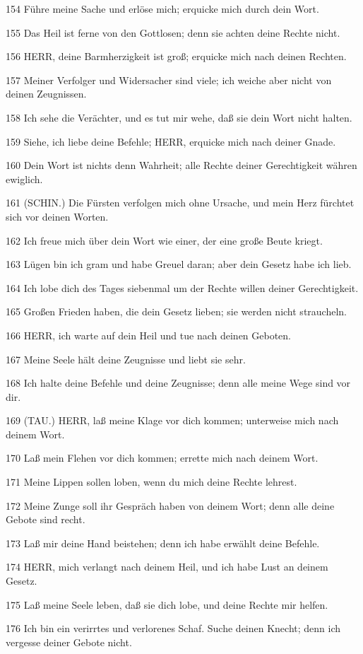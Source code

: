 \par 154 Führe meine Sache und erlöse mich; erquicke mich durch dein Wort.
\par 155 Das Heil ist ferne von den Gottlosen; denn sie achten deine Rechte nicht.
\par 156 HERR, deine Barmherzigkeit ist groß; erquicke mich nach deinen Rechten.
\par 157 Meiner Verfolger und Widersacher sind viele; ich weiche aber nicht von deinen Zeugnissen.
\par 158 Ich sehe die Verächter, und es tut mir wehe, daß sie dein Wort nicht halten.
\par 159 Siehe, ich liebe deine Befehle; HERR, erquicke mich nach deiner Gnade.
\par 160 Dein Wort ist nichts denn Wahrheit; alle Rechte deiner Gerechtigkeit währen ewiglich.
\par 161 (SCHIN.) Die Fürsten verfolgen mich ohne Ursache, und mein Herz fürchtet sich vor deinen Worten.
\par 162 Ich freue mich über dein Wort wie einer, der eine große Beute kriegt.
\par 163 Lügen bin ich gram und habe Greuel daran; aber dein Gesetz habe ich lieb.
\par 164 Ich lobe dich des Tages siebenmal um der Rechte willen deiner Gerechtigkeit.
\par 165 Großen Frieden haben, die dein Gesetz lieben; sie werden nicht straucheln.
\par 166 HERR, ich warte auf dein Heil und tue nach deinen Geboten.
\par 167 Meine Seele hält deine Zeugnisse und liebt sie sehr.
\par 168 Ich halte deine Befehle und deine Zeugnisse; denn alle meine Wege sind vor dir.
\par 169 (TAU.) HERR, laß meine Klage vor dich kommen; unterweise mich nach deinem Wort.
\par 170 Laß mein Flehen vor dich kommen; errette mich nach deinem Wort.
\par 171 Meine Lippen sollen loben, wenn du mich deine Rechte lehrest.
\par 172 Meine Zunge soll ihr Gespräch haben von deinem Wort; denn alle deine Gebote sind recht.
\par 173 Laß mir deine Hand beistehen; denn ich habe erwählt deine Befehle.
\par 174 HERR, mich verlangt nach deinem Heil, und ich habe Lust an deinem Gesetz.
\par 175 Laß meine Seele leben, daß sie dich lobe, und deine Rechte mir helfen.
\par 176 Ich bin ein verirrtes und verlorenes Schaf. Suche deinen Knecht; denn ich vergesse deiner Gebote nicht.

